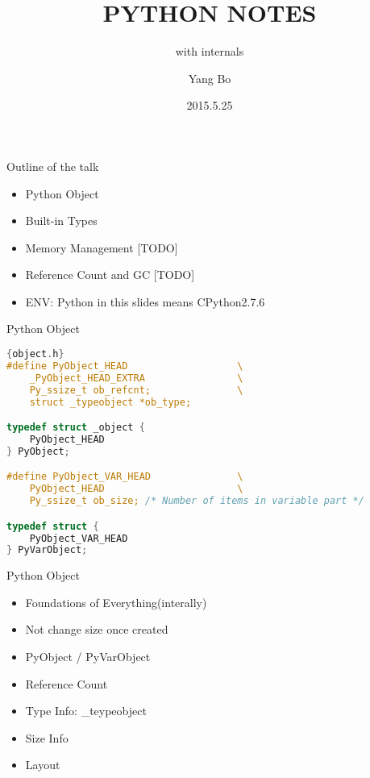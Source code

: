 \documentclass[xcolor=svgnames]{beamer}
\title{PYTHON NOTES}
\subtitle{with internals}
\author{Yang Bo}
\institute[Admaster]{
    RDBJ \\
    Admaster
}
\date{2015.5.25}
\begin{document}
\begin{frame}[plain]
  \titlepage
\end{frame}
\begin{frame}{Outline of the talk} 
 
\begin{itemize} 
  \item Python Object
  \item Built-in Types 
  \item Memory Management [TODO]
  \item Reference Count and GC [TODO]
  \item ENV: Python in this slides means CPython2.7.6
\end{itemize} 
 
\end{frame} 

\begin{frame}[fragile]{Python Object}
    \begin{lstlisting}[language=C]{object.h}
#define PyObject_HEAD                   \
    _PyObject_HEAD_EXTRA                \
    Py_ssize_t ob_refcnt;               \
    struct _typeobject *ob_type;

typedef struct _object {
    PyObject_HEAD
} PyObject;

#define PyObject_VAR_HEAD               \
    PyObject_HEAD                       \
    Py_ssize_t ob_size; /* Number of items in variable part */

typedef struct {
    PyObject_VAR_HEAD
} PyVarObject;
\end{lstlisting} 
\end{frame}

\begin{frame}{Python Object}
  \begin{itemize}
    \item Foundations of Everything(interally)
    \item Not change size once created
    \item PyObject / PyVarObject
    \item Reference Count
    \item Type Info: \_teypeobject
    \item Size Info
    \item Layout
  \end{itemize}
\end{frame}
\end{document}
